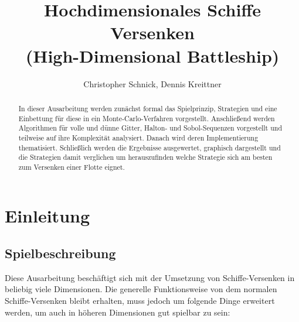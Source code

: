 \documentclass[a4paper,12pt]{llncs}
\numberwithin{equation}{section}
\begin{document}

\author{Christopher Schnick, Dennis Kreittner}

\title{Hochdimensionales Schiffe Versenken \\
(High-Dimensional Battleship)}

\maketitle

\thispagestyle{empty}

\begin{abstract}
In dieser Ausarbeitung werden zunächst formal das Spielprinzip, Strategien und eine Einbettung für diese in ein Monte-Carlo-Verfahren vorgestellt. Anschließend werden Algorithmen für volle und dünne Gitter, Halton- und Sobol-Sequenzen vorgestellt und teilweise auf ihre Komplexität analysiert. Danach wird deren Implementierung thematisiert. Schließlich werden die Ergebnisse ausgewertet, graphisch dargestellt und die Strategien damit verglichen um herauszufinden welche Strategie sich am besten zum Versenken einer Flotte eignet.
\end{abstract}

\section{Einleitung}

\subsection{Spielbeschreibung}
Diese Ausarbeitung beschäftigt sich mit der Umsetzung von Schiffe-Versenken in beliebig viele Dimensionen.
Die generelle Funktionsweise von dem normalen Schiffe-Versenken bleibt erhalten, muss jedoch um folgende Dinge erweitert werden, um auch in höheren Dimensionen gut spielbar zu sein:
\end{document}
